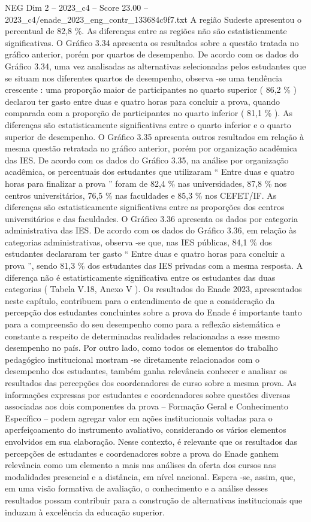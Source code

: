 \begin{textsample}{NEG Dim 2 – 2023\_c4 – Score 23.00 – 2023\_c4/enade\_2023\_eng\_contr\_133684c9f7.txt}
A região Sudeste apresentou o percentual de 82,8 \%.
As diferenças entre as regiões não são estatisticamente significativas.
O Gráfico 3.34 apresenta os resultados sobre a questão tratada no gráfico anterior, porém por quartos de desempenho.
De acordo com os dados do Gráfico 3.34, uma vez analisadas as alternativas selecionadas pelos estudantes que se situam nos diferentes quartos de desempenho, observa -se uma tendência crescente : uma proporção maior de participantes no quarto superior ( 86,2 \% ) declarou ter gasto entre duas e quatro horas para concluir a prova, quando comparada com a proporção de participantes no quarto inferior ( 81,1 \% ).
As diferenças são estatisticamente significativas entre o quarto inferior e o quarto superior de desempenho.
O Gráfico 3.35 apresenta outros resultados em relação à mesma questão retratada no gráfico anterior, porém por organização acadêmica das IES.
De acordo com os dados do Gráfico 3.35, na análise por organização acadêmica, os percentuais dos estudantes que utilizaram “ Entre duas e quatro horas para finalizar a prova ” foram de 82,4 \% nas universidades, 87,8 \% nos centros universitários, 76,5 \% nas faculdades e 85,3 \% nos CEFET/IF.
As diferenças são estatisticamente significativas entre as proporções dos centros universitários e das faculdades.
O Gráfico 3.36 apresenta os dados por categoria administrativa das IES.
De acordo com os dados do Gráfico 3.36, em relação às categorias administrativas, observa -se que, nas IES públicas, 84,1 \% dos estudantes declararam ter gasto “ Entre duas e quatro horas para concluir a prova ”, sendo 81,3 \% dos estudantes das IES privadas com a mesma resposta.
A diferença não é estatisticamente significativa entre os estudantes das duas categorias ( Tabela V.18, Anexo V ).
Os resultados do Enade 2023, apresentados neste capítulo, contribuem para o entendimento de que a consideração da percepção dos estudantes concluintes sobre a prova do Enade é importante tanto para a compreensão do seu desempenho como para a reflexão sistemática e constante a respeito de determinadas realidades relacionadas a esse mesmo desempenho no país.
Por outro lado, como todos os elementos do trabalho pedagógico institucional mostram -se diretamente relacionados com o desempenho dos estudantes, também ganha relevância conhecer e analisar os resultados das percepções dos coordenadores de curso sobre a mesma prova.
As informações expressas por estudantes e coordenadores sobre questões diversas associadas aos dois componentes da prova – Formação Geral e Conhecimento Específico – podem agregar valor em ações institucionais voltadas para o aperfeiçoamento do instrumento avaliativo, considerando os vários elementos envolvidos em sua elaboração.
Nesse contexto, é relevante que os resultados das percepções de estudantes e coordenadores sobre a prova do Enade ganhem relevância como um elemento a mais nas análises da oferta dos cursos nas modalidades presencial e a distância, em nível nacional.
Espera -se, assim, que, em uma visão formativa de avaliação, o conhecimento e a análise desses resultados possam contribuir para a construção de alternativas institucionais que induzam à excelência da educação superior.

\end{textsample}
